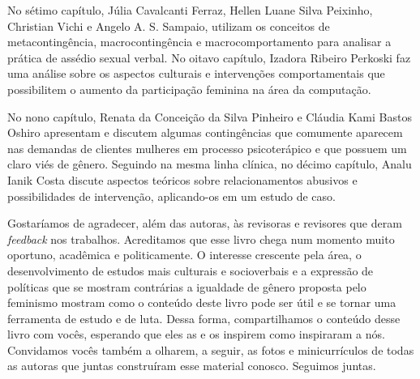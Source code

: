 No sétimo capítulo, Júlia Cavalcanti Ferraz, Hellen Luane Silva Peixinho, Christian Vichi e Angelo A. S. Sampaio, utilizam os conceitos de metacontingência, macrocontingência e macrocomportamento para analisar a prática de assédio sexual verbal. No oitavo capítulo, Izadora Ribeiro Perkoski faz uma análise sobre os aspectos culturais e intervenções comportamentais que possibilitem o aumento da participação feminina na área da computação. 

No nono capítulo, Renata da Conceição da Silva Pinheiro e Cláudia Kami Bastos Oshiro apresentam e discutem algumas contingências que comumente aparecem nas demandas de clientes mulheres em processo psicoterápico e que possuem um claro viés de gênero. Seguindo na mesma linha clínica, no décimo capítulo, Analu Ianik Costa discute aspectos teóricos sobre relacionamentos abusivos e possibilidades de intervenção, aplicando-os em um estudo de caso.

Gostaríamos de agradecer, além das autoras, às revisoras e revisores que deram \textit{feedback} nos trabalhos. Acreditamos que esse livro chega num momento muito oportuno, acadêmica e politicamente. O interesse crescente pela área, o desenvolvimento de estudos mais culturais e socioverbais e a expressão de políticas que se mostram contrárias a igualdade de gênero proposta pelo feminismo mostram como o conteúdo deste livro pode ser útil e se tornar uma ferramenta de estudo e de luta. Dessa forma, compartilhamos o conteúdo desse livro com vocês, esperando que eles as e os inspirem como inspiraram a nós. Convidamos vocês também a olharem, a seguir, as fotos e minicurrículos de todas as autoras que juntas construíram esse material conosco. Seguimos juntas.
\vfill